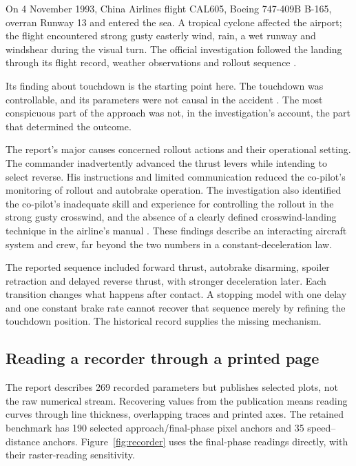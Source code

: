 \label{part:6}
On 4 November 1993, China Airlines flight CAL605, Boeing 747-409B B-165, overran Runway 13 and entered the sea. A tropical cyclone affected the airport; the flight encountered strong gusty easterly wind, rain, a wet runway and windshear during the visual turn. The official investigation followed the landing through its flight record, weather observations and rollout sequence \citep{cad}.

Its finding about touchdown is the starting point here. The touchdown was controllable, and its parameters were not causal in the accident \citep[§2.6.5]{cad}. The most conspicuous part of the approach was not, in the investigation's account, the part that determined the outcome.

The report's major causes concerned rollout actions and their operational setting. The commander inadvertently advanced the thrust levers while intending to select reverse. His instructions and limited communication reduced the co-pilot's monitoring of rollout and autobrake operation. The investigation also identified the co-pilot's inadequate skill and experience for controlling the rollout in the strong gusty crosswind, and the absence of a clearly defined crosswind-landing technique in the airline's manual \citep[Synopsis; §3]{cad}. These findings describe an interacting aircraft system and crew, far beyond the two numbers in a constant-deceleration law.

The reported sequence included forward thrust, autobrake disarming, spoiler retraction and delayed reverse thrust, with stronger deceleration later. Each transition changes what happens after contact. A stopping model with one delay and one constant brake rate cannot recover that sequence merely by refining the touchdown position. The historical record supplies the missing mechanism.

\subsection*{Reading a recorder through a printed page}
The report describes 269 recorded parameters but publishes selected plots, not the raw numerical stream. Recovering values from the publication means reading curves through line thickness, overlapping traces and printed axes. The retained benchmark has 190 selected approach/final-phase pixel anchors and 35 speed--distance anchors. Figure~\ref{fig:recorder} uses the final-phase readings directly, with their raster-reading sensitivity.

